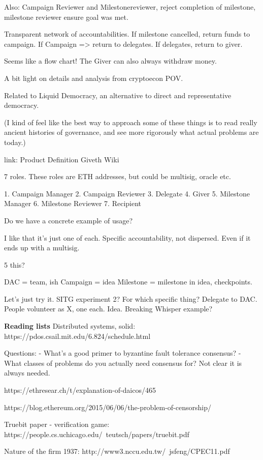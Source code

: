 \documentclass[12pt]{report}
\begin{document}
Also: Campaign Reviewer and Milestonereviewer, reject completion of milestone,
milestone reviewer ensure goal was met.

Transparent network of accountabilities. If milestone cancelled, return funds to campaign. If Campaign => return to delegates. If delegates, return to giver.

Seems like a flow chart! The Giver can also always withdraw money.

A bit light on details and analysis from cryptoecon POV.

Related to Liquid Democracy, an alternative to direct and representative democracy.

(I kind of feel like the best way to approach some of these things is to read really ancient histories of governance, and see more rigorously what actual problems are today.)

link: Product Definition Giveth Wiki

7 roles. These roles are ETH addresses, but could be multisig, oracle etc.

1. Campaign Manager
2. Campaign Reviewer
3. Delegate
4. Giver
5. Milestone Manager
6. Milestone Reviewer
7. Recipient

Do we have a concrete example of usage?

I like that it's just one of each. Specific accountability, not dispersed. Even if it ends up with a multisig.

5%
this?

DAC = team, ish
Campaign = idea
Milestone = milestone in idea, checkpoints.

Let's just try it. SITG experiment 2? For which specific thing? Delegate to DAC. People volunteer as X, one each. Idea. Breaking Whisper example?


\textbf{Reading lists}
Distributed systems, solid: https://pdos.csail.mit.edu/6.824/schedule.html


Questions:
- What's a good primer to byzantine fault tolerance consensus?
- What classes of problems do you actually need consensus for? Not clear it is always needed.

https://ethresear.ch/t/explanation-of-daicos/465

https://blog.ethereum.org/2015/06/06/the-problem-of-censorship/

Truebit paper - verification game: https://people.cs.uchicago.edu/~teutsch/papers/truebit.pdf

Nature of the firm 1937: http://www3.nccu.edu.tw/~jsfeng/CPEC11.pdf
\end{document}

